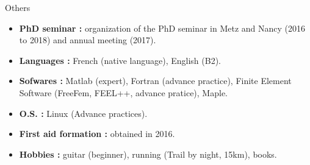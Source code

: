 \documentclass[10pt,a4paper]{report}
\begin{document}
\vspace{0.5cm}
\noindent
{\selectfont
\begin{Large}
Others
\end{Large}
\hrulefill
}
\vspace{.5cm}

\noindent
\begin{itemize}
\item \textbf{PhD seminar :} organization of the PhD seminar in Metz and Nancy (2016 to 2018) and annual meeting (2017).
\item \textbf{Languages :} French (native language), English (B2).
\item \textbf{Sofwares :} Matlab (expert), Fortran (advance practice), Finite Element Software (FreeFem, FEEL++, advance pratice), Maple.
\item \textbf{O.S. :} Linux (Advance practices).
\item \textbf{First aid formation :} obtained in 2016.
\item \textbf{Hobbies :} guitar (beginner), running (Trail by night, 15km), books.

\end{itemize}
\end{document}
